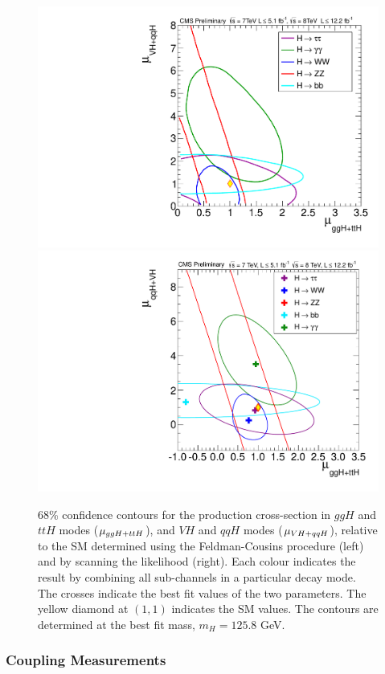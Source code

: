 \begin{figure}
\begin{center}
\includegraphics[width=.49\textwidth]{combinations/sqr_rvrf_fc_2d.pdf}
\includegraphics[width=.49\textwidth]{combinations/sqr_rvrf_scan_2d_all_68.pdf}
\caption{68\% confidence contours for the production cross-section in 
$ggH$ and $ttH$ modes ($\mu_{ggH+ttH}$), and $VH$ and $qqH$ modes ($\mu_{VH+qqH}$), 
relative to the SM determined using the Feldman-Cousins procedure (left) and 
by scanning the likelihood (right). 
Each colour indicates the result by combining all sub-channels in a particular
decay mode. The crosses indicate the best fit values of the two parameters.
The yellow diamond at $(1,1)$ indicates the SM values. 
The contours are determined at the best fit mass, $m_{H}=125.8$ GeV.}
\end{center}
\label{fig:fc2d}
\end{figure}


\subsubsection{Coupling Measurements}
\label{sec:coupling}

